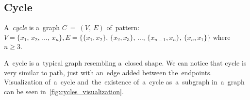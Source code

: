 \subsection{Cycle}
\begin{definition}[Cycle]
    A~\emph{cycle} is a~graph $C~=~(V,~E)$ of~pattern: \\ $V = \{x_1,\,x_2,\,\dots,\,x_n\}, E = \{\{x_1, x_2\},\,\{x_2, x_3\},\,\dots,\,\{x_{n-1}, x_n\},\,\{x_n, x_1\}\}$ where $n \geq 3$.
\end{definition}
A~cycle is a~typical graph resembling a~closed shape. We can notice that cycle is very similar to path, just with an~edge added between the~endpoints. Visualization of~a~cycle and~the~existence of~a~cycle as~a~subgraph in~a~graph can be seen in~\autoref{fig:cycles_visualization}.
\\
\\
\\
